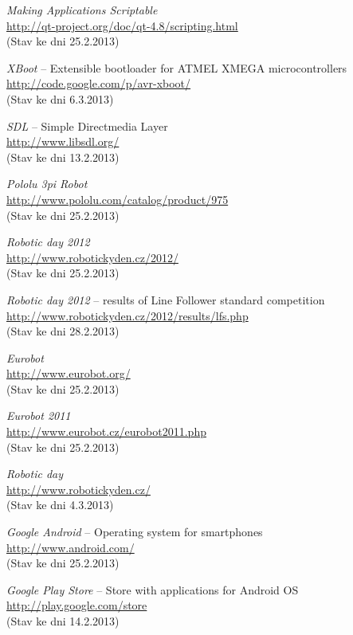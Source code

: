 \documentclass[12pt, a4paper, oneside]{article}
\newcommand{\It}{\textit}  %
\begin{document}
\begin{thebibliography}{99}
     \It{Making Applications Scriptable} \\
    \url{http://qt-project.org/doc/qt-4.8/scripting.html}\\
    (Stav ke dni 25.2.2013)

     \It{XBoot} -- Extensible bootloader for ATMEL XMEGA microcontrollers \\
    \url{http://code.google.com/p/avr-xboot/}\\
    (Stav ke dni 6.3.2013)

     \It{SDL} -- Simple Directmedia Layer \\
    \url{http://www.libsdl.org/}\\
    (Stav ke dni 13.2.2013)

     \It{Pololu 3pi Robot} \\
    \url{http://www.pololu.com/catalog/product/975}\\
    (Stav ke dni 25.2.2013)

     \It{Robotic day 2012} \\
    \url{http://www.robotickyden.cz/2012/}\\
    (Stav ke dni 25.2.2013)

     \It{Robotic day 2012} -- results of Line Follower standard competition\\
    \url{http://www.robotickyden.cz/2012/results/lfs.php}\\
    (Stav ke dni 28.2.2013)

     \It{Eurobot} \\
    \url{http://www.eurobot.org/}\\
    (Stav ke dni 25.2.2013)

     \It{Eurobot 2011} \\
    \url{http://www.eurobot.cz/eurobot2011.php}\\
    (Stav ke dni 25.2.2013)

     \It{Robotic day} \\
    \url{http://www.robotickyden.cz/}\\
    (Stav ke dni 4.3.2013)

     \It{Google Android} -- Operating system for smartphones\\
    \url{http://www.android.com/}\\
    (Stav ke dni 25.2.2013)

     \It{Google Play Store} -- Store with applications for Android OS\\
    \url{http://play.google.com/store}\\
    (Stav ke dni 14.2.2013)


\end{thebibliography}
\end{document}
